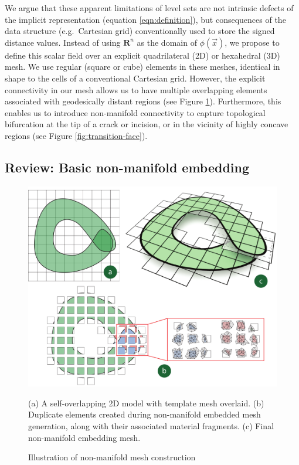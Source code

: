 We argue that these apparent limitations of level sets are not
intrinsic defects of the implicit representation (equation
\ref{eqn:definition}), but consequences of the data structure (e.g.\
Cartesian grid) conventionally used to store the signed distance
values. Instead of using $\mathbf{R}^n$ as the domain of
$\phi(\vec{x})$, we propose to define this scalar field over an
explicit quadrilateral (2D) or hexahedral (3D) mesh. We use regular
(square or cube) elements in these meshes, identical in shape to the
cells of a conventional Cartesian grid. However, the explicit
connectivity in our mesh allows us to have multiple overlapping
elements associated with geodesically distant regions (see Figure
\ref{fig:non-manifold-level-set-generation}). Furthermore, this
enables us to introduce non-manifold connectivity to capture
topological bifurcation at the tip of a crack or incision, or in the
vicinity of highly concave regions (see Figure
\ref{fig:transition-face}).

\subsection{Review: Basic non-manifold embedding}
\label{sec:stockembedding}

\begin{figure}
\centering
\includegraphics[width=.91\columnwidth]{chapter_nonmanifoldlevelsets/images/cshape_strip2.pdf}
\vspace*{-.1in}
\caption{Illustration of non-manifold mesh construction}{(a) A
  self-overlapping 2D model with template mesh overlaid. (b) Duplicate
  elements created during non-manifold embedded mesh generation, along
  with their associated material fragments. (c) Final non-manifold
  embedding mesh.  }
\label{fig:non-manifold-level-set-generation}
\vspace*{-.2in}
\end{figure}

